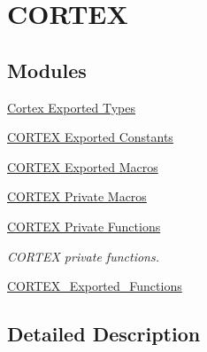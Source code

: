 \hypertarget{group___c_o_r_t_e_x}{}\section{C\+O\+R\+T\+EX}
\label{group___c_o_r_t_e_x}
\subsection*{Modules}
\begin{DoxyCompactItemize}
\item 
\hyperlink{group___c_o_r_t_e_x___exported___types}{Cortex Exported Types}
\item 
\hyperlink{group___c_o_r_t_e_x___exported___constants}{C\+O\+R\+T\+E\+X Exported Constants}
\item 
\hyperlink{group___c_o_r_t_e_x___exported___macros}{C\+O\+R\+T\+E\+X Exported Macros}
\item 
\hyperlink{group___c_o_r_t_e_x___private___macros}{C\+O\+R\+T\+E\+X Private Macros}
\item 
\hyperlink{group___c_o_r_t_e_x___private___functions}{C\+O\+R\+T\+E\+X Private Functions}
\begin{DoxyCompactList}\small\item\em C\+O\+R\+T\+EX private functions. \end{DoxyCompactList}\item 
\hyperlink{group___c_o_r_t_e_x___exported___functions}{C\+O\+R\+T\+E\+X\+\_\+\+Exported\+\_\+\+Functions}
\end{DoxyCompactItemize}


\subsection{Detailed Description}
